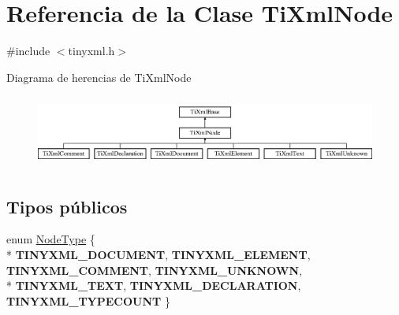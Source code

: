 \hypertarget{class_ti_xml_node}{\section{Referencia de la Clase Ti\-Xml\-Node}
\label{class_ti_xml_node}
}


{\ttfamily \#include $<$tinyxml.\-h$>$}

Diagrama de herencias de Ti\-Xml\-Node\begin{figure}[H]
\begin{center}
\leavevmode
\includegraphics[height=2.413793cm]{class_ti_xml_node}
\end{center}
\end{figure}
\subsection*{Tipos públicos}
\begin{DoxyCompactItemize}
\item 
enum \hyperlink{class_ti_xml_node_a836eded4920ab9e9ef28496f48cd95a2}{Node\-Type} \{ \\*
{\bfseries T\-I\-N\-Y\-X\-M\-L\-\_\-\-D\-O\-C\-U\-M\-E\-N\-T}, 
{\bfseries T\-I\-N\-Y\-X\-M\-L\-\_\-\-E\-L\-E\-M\-E\-N\-T}, 
{\bfseries T\-I\-N\-Y\-X\-M\-L\-\_\-\-C\-O\-M\-M\-E\-N\-T}, 
{\bfseries T\-I\-N\-Y\-X\-M\-L\-\_\-\-U\-N\-K\-N\-O\-W\-N}, 
\\*
{\bfseries T\-I\-N\-Y\-X\-M\-L\-\_\-\-T\-E\-X\-T}, 
{\bfseries T\-I\-N\-Y\-X\-M\-L\-\_\-\-D\-E\-C\-L\-A\-R\-A\-T\-I\-O\-N}, 
{\bfseries T\-I\-N\-Y\-X\-M\-L\-\_\-\-T\-Y\-P\-E\-C\-O\-U\-N\-T}
 \}
\end{DoxyCompactItemize}
